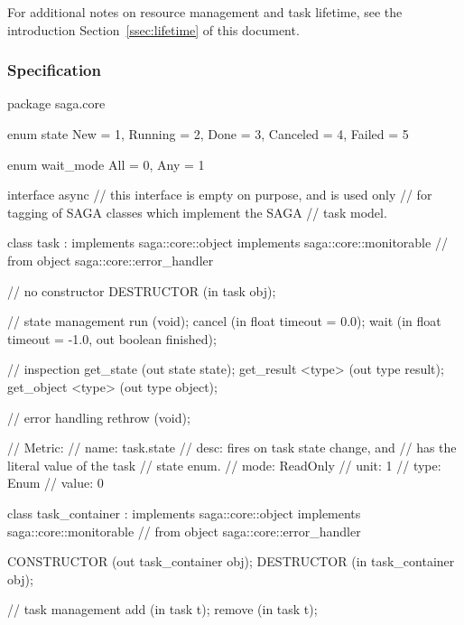   For additional notes on resource management and task lifetime,
  see the introduction Section~\ref{ssec:lifetime} of this
  document.
 
 \subsubsection{Specification}
 
 \begin{myspec}
  package saga.core
  {
    enum state
    {
      New       =  1,
      Running   =  2,
      Done      =  3,
      Canceled  =  4,
      Failed    =  5
    }
 
 
    enum wait_mode
    {
      All       =  0,
      Any       =  1
    }
 
 
    interface async
    {
      // this interface is empty on purpose, and is used only
      // for tagging of SAGA classes which implement the SAGA
      // task model.
    }
 
 
    class task : implements   saga::core::object
                 implements   saga::core::monitorable
              // from object  saga::core::error_handler
    {
      // no constructor
      DESTRUCTOR       (in  task            obj);
 
      // state management
      run               (void);
      cancel            (in  float           timeout =  0.0);
      wait              (in  float           timeout = -1.0,
                         out boolean         finished);
 
      // inspection
      get_state         (out state           state);
      get_result <type> (out type            result);
      get_object <type> (out type            object);
 
      // error handling
      rethrow           (void);
 
      // Metric:
      //   name:  task.state
      //   desc:  fires on task state change, and
      //          has the literal value of the task
      //          state enum.
      //   mode:  ReadOnly
      //   unit:  1
      //   type:  Enum
      //   value: 0
    }
 
 
    class task_container : implements   saga::core::object
                           implements   saga::core::monitorable
                        // from object  saga::core::error_handler
    {
      CONSTRUCTOR      (out task_container  obj);
      DESTRUCTOR       (in  task_container  obj);
 
      // task management
      add               (in  task            t);
      remove            (in  task            t);
 
}}
\end{myspec}
